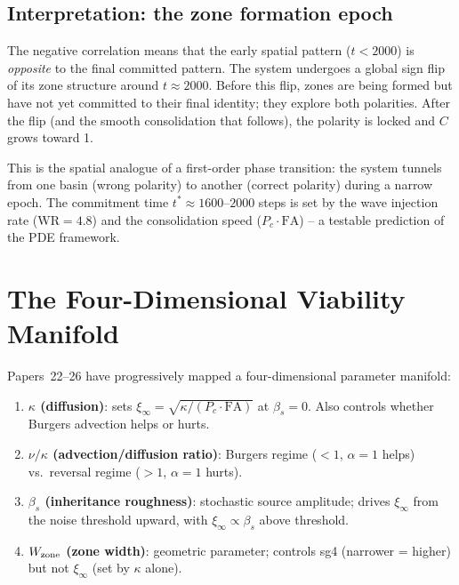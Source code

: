 \documentclass[11pt,a4paper]{article}
\begin{document}
\subsection{Interpretation: the zone formation epoch}

The negative correlation means that the early spatial pattern
($t < 2000$) is \emph{opposite} to the final committed pattern.  The system
undergoes a global sign flip of its zone structure around $t \approx 2000$.
Before this flip, zones are being formed but have not yet committed to their
final identity; they explore both polarities.  After the flip (and the smooth
consolidation that follows), the polarity is locked and $C$ grows toward 1.

This is the spatial analogue of a first-order phase transition: the system
tunnels from one basin (wrong polarity) to another (correct polarity) during
a narrow epoch.  The commitment time $t^* \approx 1600$--$2000$ steps is
set by the wave injection rate ($\mathrm{WR}=4.8$) and the consolidation
speed ($P_c \cdot \mathrm{FA}$) -- a testable prediction of the PDE framework.

\section{The Four-Dimensional Viability Manifold}
\label{sec:manifold}

Papers~22--26 have progressively mapped a four-dimensional parameter manifold:
\begin{enumerate}
  \item \textbf{$\kappa$ (diffusion)}: sets $\xi_\infty = \sqrt{\kappa/(P_c\cdot\mathrm{FA})}$
        at $\beta_s = 0$.  Also controls whether Burgers advection helps or hurts.
  \item \textbf{$\nu/\kappa$ (advection/diffusion ratio)}: Burgers regime ($<1$,
        $\alpha=1$ helps) vs.\ reversal regime ($>1$, $\alpha=1$ hurts).
  \item \textbf{$\beta_s$ (inheritance roughness)}: stochastic source amplitude;
        drives $\xi_\infty$ from the noise threshold upward, with $\xi_\infty \propto \beta_s$
        above threshold.
  \item \textbf{$W_{\rm zone}$ (zone width)}: geometric parameter; controls
        sg4 (narrower = higher) but not $\xi_\infty$ (set by $\kappa$ alone).
\end{enumerate}
\end{document}
